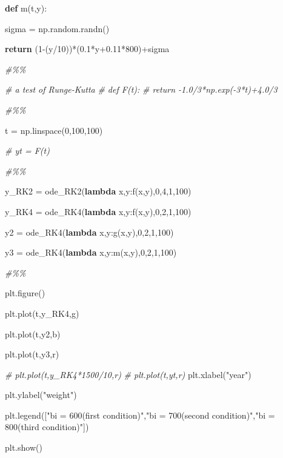\documentclass[
]{article}
\newenvironment{Shaded}{}{}
\newcommand{\CommentTok}[1]{\textcolor[rgb]{0.38,0.63,0.69}{\textit{#1}}}
\newcommand{\ControlFlowTok}[1]{\textcolor[rgb]{0.00,0.44,0.13}{\textbf{#1}}}
\newcommand{\DecValTok}[1]{\textcolor[rgb]{0.25,0.63,0.44}{#1}}
\newcommand{\FloatTok}[1]{\textcolor[rgb]{0.25,0.63,0.44}{#1}}
\newcommand{\KeywordTok}[1]{\textcolor[rgb]{0.00,0.44,0.13}{\textbf{#1}}}
\newcommand{\NormalTok}[1]{#1}
\newcommand{\OperatorTok}[1]{\textcolor[rgb]{0.40,0.40,0.40}{#1}}
\newcommand{\StringTok}[1]{\textcolor[rgb]{0.25,0.44,0.63}{#1}}
\begin{document}
\begin{Shaded}
\begin{Highlighting}[]
\KeywordTok{def}\NormalTok{ m(t,y):
}
\NormalTok{    sigma }\OperatorTok{=}\NormalTok{ np.random.randn()
}
    \ControlFlowTok{return}\NormalTok{ (}\DecValTok{1}\OperatorTok{{-}}\NormalTok{(y}\OperatorTok{/}\DecValTok{10}\NormalTok{))}\OperatorTok{*}\NormalTok{(}\FloatTok{0.1}\OperatorTok{*}\NormalTok{y}\OperatorTok{+}\FloatTok{0.11}\OperatorTok{*}\DecValTok{800}\NormalTok{)}\OperatorTok{+}\NormalTok{sigma
}


\CommentTok{\#\%\%
}


\CommentTok{\# a test of Runge{-}Kutta
}
\CommentTok{\# def F(t):
}
\CommentTok{\#     return {-}1.0/3*np.exp({-}3*t)+4.0/3
}


\CommentTok{\#\%\%
}


\NormalTok{t }\OperatorTok{=}\NormalTok{ np.linspace(}\DecValTok{0}\NormalTok{,}\DecValTok{100}\NormalTok{,}\DecValTok{100}\NormalTok{)
}
\CommentTok{\# yt = F(t)
}


\CommentTok{\#\%\%
}


\NormalTok{y\_RK2 }\OperatorTok{=}\NormalTok{ ode\_RK2(}\KeywordTok{lambda}\NormalTok{ x,y:f(x,y),}\DecValTok{0}\NormalTok{,}\DecValTok{4}\NormalTok{,}\DecValTok{1}\NormalTok{,}\DecValTok{100}\NormalTok{)
}
\NormalTok{y\_RK4 }\OperatorTok{=}\NormalTok{ ode\_RK4(}\KeywordTok{lambda}\NormalTok{ x,y:f(x,y),}\DecValTok{0}\NormalTok{,}\DecValTok{2}\NormalTok{,}\DecValTok{1}\NormalTok{,}\DecValTok{100}\NormalTok{)
}
\NormalTok{y2 }\OperatorTok{=}\NormalTok{ ode\_RK4(}\KeywordTok{lambda}\NormalTok{ x,y:g(x,y),}\DecValTok{0}\NormalTok{,}\DecValTok{2}\NormalTok{,}\DecValTok{1}\NormalTok{,}\DecValTok{100}\NormalTok{)
}
\NormalTok{y3 }\OperatorTok{=}\NormalTok{ ode\_RK4(}\KeywordTok{lambda}\NormalTok{ x,y:m(x,y),}\DecValTok{0}\NormalTok{,}\DecValTok{2}\NormalTok{,}\DecValTok{1}\NormalTok{,}\DecValTok{100}\NormalTok{)
}


\CommentTok{\#\%\%
}


\NormalTok{plt.figure()
}
\NormalTok{plt.plot(t,y\_RK4,}\StringTok{\textquotesingle{}g\textquotesingle{}}\NormalTok{)
}
\NormalTok{plt.plot(t,y2,}\StringTok{\textquotesingle{}b\textquotesingle{}}\NormalTok{)
}
\NormalTok{plt.plot(t,y3,}\StringTok{\textquotesingle{}r\textquotesingle{}}\NormalTok{)
}
\CommentTok{\# plt.plot(t,y\_RK4*1500/10,\textquotesingle{}r\textquotesingle{})
}
\CommentTok{\# plt.plot(t,yt,\textquotesingle{}r\textquotesingle{})
}
\NormalTok{plt.xlabel(}\StringTok{"year"}\NormalTok{)
}
\NormalTok{plt.ylabel(}\StringTok{"weight"}\NormalTok{)
}
\NormalTok{plt.legend([}\StringTok{"bi = 600(first condition)"}\NormalTok{,}\StringTok{"bi = 700(second condition)"}\NormalTok{,}\StringTok{"bi = 800(third condition)"}\NormalTok{])
}
\NormalTok{plt.show()}
\end{Highlighting}
\end{Shaded}
\end{document}
